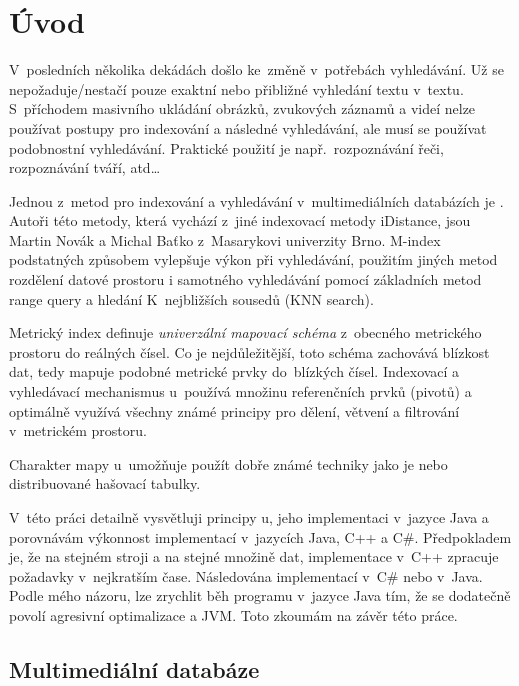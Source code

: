 \chapter{Úvod}

V~posledních několika dekádách došlo ke~změně v~potřebách vyhledávání.
Už se nepožaduje/nestačí pouze exaktní nebo přibližné vyhledání textu
v~textu. S~příchodem masivního ukládání obrázků, zvukových záznamů
a videí nelze používat  postupy pro indexování a následné
vyhledávání, ale musí se používat podobnostní vyhledávání. Praktické
použití je např.~rozpoznávání řeči, rozpoznávání tváří, atd\ldots{}

Jednou z~metod pro indexování a vyhledávání v~multimediálních databázích
je \MIndex\cite{Novak:2009:MIE:1637863.1638184}\@. Autoři této
metody, která vychází z~jiné indexovací metody iDistance\cite{Jagadish:2005:IAB:1071610.1071612},
jsou Martin Novák a Michal Baťko z~Masarykovi univerzity Brno\@.
M-index podstatných způsobem vylepšuje výkon při vyhledávání, použitím
jiných metod rozdělení datové prostoru i samotného vyhledávání pomocí
základních metod range query a hledání K~nejbližších sousedů (KNN
search)\@.

Metrický index definuje \emph{univerzální mapovací schéma} z~obecného
metrického prostoru do reálných čísel\@. Co je nejdůležitější, toto
schéma zachovává blízkost dat, tedy mapuje podobné metrické prvky
do~blízkých čísel\@. Indexovací a vyhledávací mechanismus \MIndex
u~používá množinu referenčních prvků (pivotů) a optimálně využívá všechny
známé principy pro dělení, větvení a filtrování v~metrickém prostoru\@.

Charakter mapy \MIndex u~umožňuje použít dobře známé techniky jako
je \BPTree\cite{Cormen:2001:IA:580470} nebo distribuované
hašovací tabulky\@.

V~této práci detailně vysvětluji principy \MIndex u, jeho implementaci
v~jazyce Java a porovnávám výkonnost implementací \MIndex v~jazycích
Java, C++ a C\#. Předpokladem je, že na stejném stroji a na stejné
množině dat, implementace v~C++ zpracuje požadavky v~nejkratším
čase. Následována implementací v~C\# nebo v~Java. Podle mého názoru,
lze zrychlit běh programu v~jazyce Java tím, že se dodatečně povolí
agresivní optimalizace a  JVM. Toto zkoumám na závěr této práce.

\section{Multimediální databáze}

